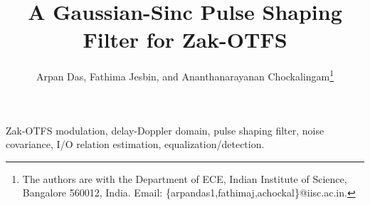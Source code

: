 \documentclass[journal,10pt]{IEEEtran}
\begin{document}
\title{A 
Gaussian-Sinc Pulse Shaping Filter for Zak-OTFS}
\author{Arpan Das, Fathima Jesbin, and Ananthanarayanan Chockalingam\thanks{The authors are with the Department of ECE, Indian Institute of Science, Bangalore 560012, India. Email: \{arpandas1,fathimaj,achockal\}@iisc.ac.in.}
\vspace{-2mm}
}
\maketitle

\vspace{-2.5mm}
\begin{IEEEkeywords}
Zak-OTFS modulation, delay-Doppler domain, pulse shaping filter, noise covariance, I/O relation estimation, equalization/detection. 
\end{IEEEkeywords}








\end{document}
